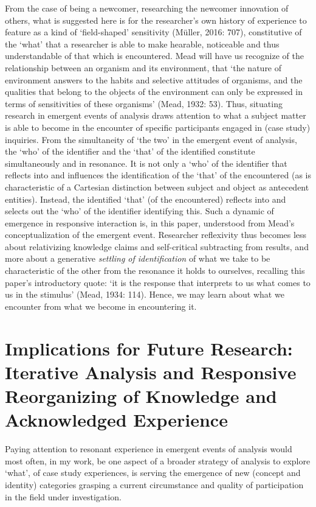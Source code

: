 From the case of being a newcomer, researching the newcomer innovation of others, what is suggested here is for the researcher’s own history of experience to feature as a kind of ‘field-shaped’ sensitivity (Müller, 2016: 707), constitutive of the ‘what’ that a researcher is able to make hearable, noticeable and thus understandable of that which is encountered. Mead will have us recognize of the relationship between an organism and its environment, that ‘the nature of environment answers to the habits and selective attitudes of organisms, and the qualities that belong to the objects of the environment can only be expressed in terms of sensitivities of these organisms’ (Mead, 1932: 53). Thus, situating research in emergent events of analysis draws attention to what a subject matter is able to become in the encounter of specific participants engaged in (case study) inquiries. From the simultaneity of ‘the two’ in the emergent event of analysis, the ‘who’ of the identifier and the ‘that’ of the identified constitute simultaneously and in resonance. It is not only a ‘who’ of the identifier that reflects into and influences the identification of the ‘that’ of the encountered (as is characteristic of a Cartesian distinction between subject and object as antecedent entities). Instead, the identified ‘that’ (of the encountered) reflects into and selects out the ‘who’ of the identifier identifying this. Such a dynamic of emergence in responsive interaction is, in this paper, understood from Mead’s conceptualization of the emergent event. Researcher reflexivity thus becomes less about relativizing knowledge claims and self-critical subtracting from results, and more about a generative \textit{settling of identification} of what we take to be characteristic of the other from the resonance it holds to ourselves, recalling this paper’s introductory quote: ‘it is the response that interprets to us what comes to us in the stimulus’ (Mead, 1934: 114). Hence, we may learn about what we encounter from what we become in encountering it. 

\section{Implications for Future Research: Iterative Analysis and Responsive Reorganizing of Knowledge and Acknowledged Experience}
Paying attention to resonant experience in emergent events of analysis would most often, in my work, be one aspect of a broader strategy of analysis to explore ‘what’, of case study experiences, is serving the emergence of new (concept and identity) categories grasping a current circumstance and quality of participation in the field under investigation. 

